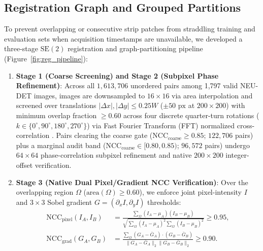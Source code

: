 \documentclass[pdflatex,sn-apa]{sn-jnl}
\begin{document}
\subsection{Registration Graph and Grouped Partitions}\label{sec:frozen_partition}
To prevent overlapping or consecutive strip patches from straddling training and evaluation sets when acquisition timestamps are unavailable, we developed a three-stage $\mathrm{SE}(2)$ registration and graph-partitioning pipeline (Figure~\ref{fig:reg_pipeline}):
\begin{enumerate}[leftmargin=2em]
    \item \textbf{Stage 1 (Coarse Screening) and Stage 2 (Subpixel Phase Refinement)}: Across all $1,613,706$ unordered pairs among 1,797 valid NEU-DET images, images are downsampled to $16 \times 16$ via area interpolation and screened over translations $|\Delta x|, |\Delta y| \le 0.25 W$ ($\pm 50\text{ px}$ at $200\times 200$) with minimum overlap fraction $\ge 0.60$ across four discrete quarter-turn rotations ($k\in\{0^\circ, 90^\circ, 180^\circ, 270^\circ\}$) via Fast Fourier Transform (FFT) normalized cross-correlation \citep{lewis1995fast}. Pairs clearing the coarse gate ($\text{NCC}_{\text{coarse}} \ge 0.85$; $122,706$ pairs) plus a marginal audit band ($\text{NCC}_{\text{coarse}} \in [0.80, 0.85)$; $96,572$ pairs) undergo $64\times 64$ phase-correlation subpixel refinement \citep{foroosh2002extension} and native $200\times 200$ integer-offset verification.
    \item \textbf{Stage 3 (Native Dual Pixel/Gradient NCC Verification)}: Over the overlapping region $\Omega$ ($\text{area}(\Omega) \ge 0.60$), we enforce joint pixel-intensity $I$ and $3\times 3$ Sobel gradient $G = (\partial_x I, \partial_y I)$ thresholds:
    \begin{align}
        \text{NCC}_{\text{pixel}}(I_A, I_B) &= \frac{\sum_{\Omega} (I_A - \mu_A)(I_B - \mu_B)}{\sqrt{\sum_{\Omega} (I_A - \mu_A)^2 \sum_{\Omega} (I_B - \mu_B)^2}} \ge 0.95, \\
        \text{NCC}_{\text{grad}}(G_A, G_B) &= \frac{\sum_{\Omega} (G_A - \bar{G}_A) \cdot (G_B - \bar{G}_B)}{\|G_A - \bar{G}_A\|_2 \|G_B - \bar{G}_B\|_2} \ge 0.90.
    \end{align}

\end{enumerate}
\end{document}
